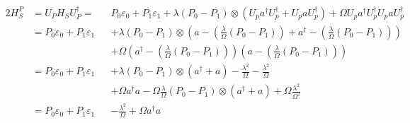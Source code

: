 	\begin{alignat*}{2}
		H_S^P &=	U_P H_S U_P^\dagger =	&& P_0\varepsilon_0 + P_1 \varepsilon_1 + \lambda (P_0 - P_1) \otimes (U_p a^\dagger U_p^\dagger  +U_p a U_p^\dagger) + \Omega U_p a^\dagger U_p^\dagger U_p a U_p^\dagger \\
		& =	P_0 \varepsilon_0 + P_1 \varepsilon_1 && + \lambda (P_0 - P_1) \otimes \left(	a  - \left(\frac{\lambda}{\Omega} (P_0 - P_1)\right) + 	a^\dagger  - \left(\frac{\lambda}{\Omega} (P_0 - P_1)\right) \right) \\
		& &&+ \Omega \left(a^\dagger  - \left(\frac{\lambda}{\Omega} (P_0 - P_1)\right)\right)\left(a  - \left(\frac{\lambda}{\Omega} (P_0 - P_1)\right)\right) \\
		&=P_0 \varepsilon_0 + P_1 \varepsilon_1 && + \lambda (P_0 - P_1) \otimes (a^\dagger  + a) -\frac{\lambda^2}{\Omega} - \frac{\lambda^2}{\Omega} \\
		& &&+\Omega a^\dagger a - \Omega \frac{\lambda}{\Omega} (P_0 - P_1) \otimes (a^\dagger +a) + \Omega \frac{\lambda^2}{\Omega^2} \\
		&= P_0 \varepsilon_0 + P_1 \varepsilon_1 && -\frac{\lambda^2}{\Omega} + \Omega a^\dagger a
	\end{alignat*}
